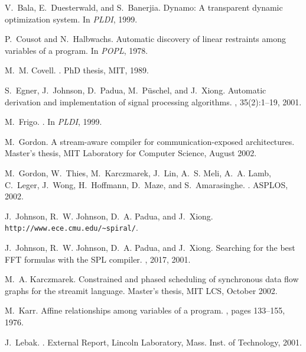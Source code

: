 \documentclass{sig-alternate}
\begin{document}
{%
{\small
  
  \begin{thebibliography}{10}

V.~Bala, E.~Duesterwald, and S.~Banerjia.
\newblock Dynamo: A transparent dynamic optimization system.
\newblock In {\em {PLDI}}, 1999.

P.~Cousot and N.~Halbwachs.
\newblock Automatic discovery of linear restraints among variables of a
  program.
\newblock In {\em POPL}, 1978.

M.~M. Covell.
.
\newblock PhD thesis, MIT, 1989.

S.~Egner, J.~Johnson, D.~Padua, M.~P{\"u}schel, and J.~Xiong.
\newblock Automatic derivation and implementation of signal processing
  algorithms.
, 35(2):1--19, 2001.

M.~Frigo.
.
\newblock In {\em PLDI}, 1999.

M.~Gordon.
\newblock A stream-aware compiler for communication-exposed architectures.
\newblock Master's thesis, MIT Laboratory for Computer Science, August 2002.

M.~Gordon, W.~Thies, M.~Karczmarek, J.~Lin, A.~S. Meli, A.~A. Lamb, C.~Leger,
  J.~Wong, H.~Hoffmann, D.~Maze, and S.~Amarasinghe.
.
\newblock ASPLOS, 2002.

J.~Johnson, R.~W. Johnson, D.~A. Padua, and J.~Xiong.
\newblock \verb+http://www.ece.cmu.edu/~spiral/+.

J.~Johnson, R.~W. Johnson, D.~A. Padua, and J.~Xiong.
\newblock Searching for the best {FFT} formulas with the {SPL} compiler.
, 2017, 2001.

M.~A. Karczmarek.
\newblock Constrained and phased scheduling of synchronous data flow graphs for
  the streamit language.
\newblock Master's thesis, MIT LCS, October 2002.

M.~Karr.
\newblock Affine relationships among variables of a program.
, pages 133--155, 1976.

J.~Lebak.
.
\newblock External Report, Lincoln Laboratory, Mass. Inst. of Technology, 2001.


\end{thebibliography}}}
\end{document}
